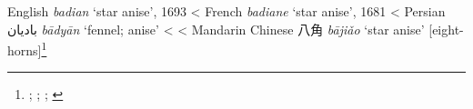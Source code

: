 \begin{etymology}\label{ety:badian}
English \textit{badian} `star anise', 1693
< French \textit{badiane} `star anise', 1681
< Persian {بادیان} \textit{bādyān} `fennel; anise'
<
< Mandarin Chinese {八角} \textit{bājiǎo} `star anise' [eight-horns]\footnote{\textcite{oed}; \textcite{tlfi}; \textcite[140]{steingass_comprehensive_1892}; \textcite[197]{hayyim_new_1934}}
\end{etymology}